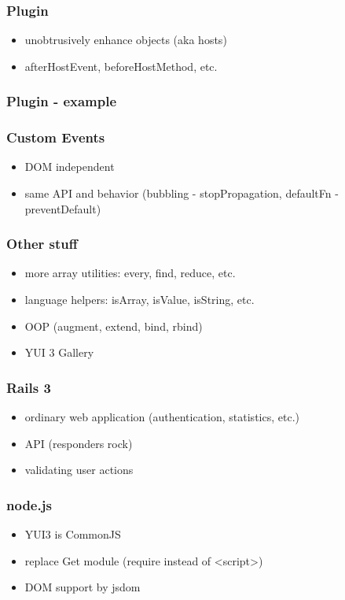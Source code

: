 \documentclass[16pt]{beamer}
\begin{document}
\begin{frame}
  \frametitle{Plugin}
  \begin{itemize}
  \item unobtrusively enhance objects (aka hosts)
  \item afterHostEvent, beforeHostMethod, etc.
  \end{itemize}
\end{frame}

\begin{frame}[fragile]
  \frametitle{Plugin - example}
  \begin{footnotesize}
    
  \end{footnotesize}
\end{frame}

\begin{frame}
  \frametitle{Custom Events}
  \begin{itemize}
  \item DOM independent
  \item same API and behavior (bubbling - stopPropagation, defaultFn - preventDefault)
  \end{itemize}
\end{frame}

\begin{frame}
  \frametitle{Other stuff}
  \begin{itemize}
  \item more array utilities: every, find, reduce, etc.
  \item language helpers: isArray, isValue, isString, etc.
  \item OOP (augment, extend, bind, rbind)
  \item YUI 3 Gallery
  \end{itemize}
\end{frame}

\begin{frame}
  \frametitle{Rails 3}
  \begin{itemize}
  \item ordinary web application (authentication, statistics, etc.)
  \item API (responders rock)
  \item validating user actions
  \end{itemize}
\end{frame}

\begin{frame}
  \frametitle{node.js}
  \begin{itemize}
  \item YUI3 is CommonJS
  \item replace Get module (require instead of <script>)
  \item DOM support by jsdom
  \end{itemize}
\end{frame}
\end{document}
